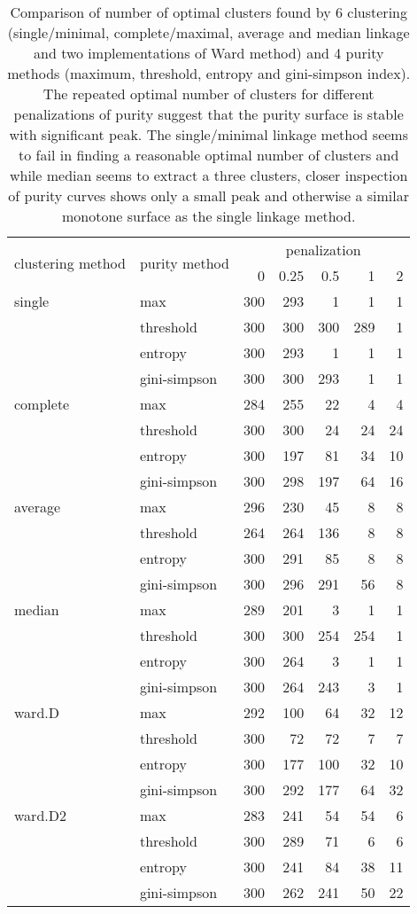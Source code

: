 \documentclass[12pt, a4paper]{article}
\begin{document}
\begin{table}
    \centering
    \begin{tabular}{llrrrrr}
    \toprule
    \multirow{2}{*}[-2pt]{clustering method} & \multirow{2}{*}[-2pt]{purity method} & \multicolumn{5}{c}{penalization}\\ \cmidrule(l){3-7}
    & & 0 & 0.25 & 0.5 & 1 & 2 \\ \midrule
    single & max & 300 & 293 & 1 & 1 & 1\\
     & threshold & 300 & 300 & 300 & 289 & 1\\
     & entropy & 300 & 293 & 1 & 1 & 1\\
     & gini-simpson & 300 & 300 & 293 & 1 & 1\\[1em]
    complete & max & 284 & 255 & 22 & 4 & 4\\
     & threshold & 300 & 300 & 24 & 24 & 24\\
     & entropy & 300 & 197 & 81 & 34 & 10\\
     & gini-simpson & 300 & 298 & 197 & 64 & 16\\[1em]
    average & max & 296 & 230 & 45 & 8 & 8\\
     & threshold & 264 & 264 & 136 & 8 & 8\\
     & entropy & 300 & 291 & 85 & 8 & 8\\
     & gini-simpson & 300 & 296 & 291 & 56 & 8\\[1em]
    median & max & 289 & 201 & 3 & 1 & 1\\
     & threshold & 300 & 300 & 254 & 254 & 1\\
     & entropy & 300 & 264 & 3 & 1 & 1\\
     & gini-simpson & 300 & 264 & 243 & 3 & 1\\[1em]
    ward.D & max & 292 & 100 & 64 & 32 & 12\\
     & threshold & 300 & 72 & 72 & 7 & 7\\
     & entropy & 300 & 177 & 100 & 32 & 10\\
     & gini-simpson & 300 & 292 & 177 & 64 & 32\\[1em]
    ward.D2 & max & 283 & 241 & 54 & 54 & 6\\
     & threshold & 300 & 289 & 71 & 6 & 6\\
     & entropy & 300 & 241 & 84 & 38 & 11\\
     & gini-simpson & 300 & 262 & 241 & 50 & 22\\
    \bottomrule
    \end{tabular}
    \caption{Comparison of number of optimal clusters found by 6 clustering (single/minimal, complete/maximal, average and median linkage and two implementations of Ward method) and 4 purity methods (maximum, threshold, entropy and gini-simpson index). The repeated optimal number of clusters for different penalizations of purity suggest that the purity surface is stable with significant peak. The single/minimal linkage method seems to fail in finding a reasonable optimal number of clusters and while median seems to extract a three clusters, closer inspection of purity curves shows only a small peak and otherwise a similar monotone surface as the single linkage method.}
\end{table}
\end{document}
